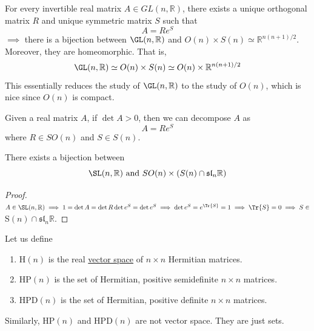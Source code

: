   \begin{corollary}
    \label{thm:uniqueness-of-the-real-polar-decomposition}
    For every invertible real matrix $A \in GL(n, \mathbb{R})$, there exists a unique orthogonal matrix $R$ and unique symmetric matrix $S$ such that
    \begin{equation}
      A = R e^S
    \end{equation}
    $\implies$ there is a bijection between $\GL(n, \mathbb{R})$ and $O(n) \times S(n) \simeq \mathbb{R}^{n(n+1)/2}$. Moreover, they are homeomorphic. That is, 
    \begin{equation}
      \GL(n, \mathbb{R}) \simeq O(n) \times S(n) \simeq O(n) \times \mathbb{R}^{n(n+1)/2}
    \end{equation}
    This essentially reduces the study of $\GL(n, \mathbb{R})$ to the study of $O(n)$, which is nice since $O(n)$ is compact. 
  \end{corollary}

  \begin{corollary}
    \label{thm:polar-decomposition-with-positive-determinant}
    Given a real matrix $A$, if $\det{A} > 0$, then we can decompose $A$ as
    \begin{equation}
      A = R e^S
    \end{equation}
    where $R \in SO(n)$ and $S \in S(n)$. 
  \end{corollary}

  \begin{corollary}
    \label{thm:polar-decomposition-of-slnr}
    There exists a bijection between
    \begin{equation}
      \SL(n, \mathbb{R}) \text{ and } SO(n) \times (S(n) \cap \mathfrak{sl}_n \mathbb{R})
    \end{equation}
  \end{corollary}
  \begin{proof}
    $A \in \SL(n, \mathbb{R}) \implies 1 = \det{A} = \det{R} \det{e^S} = \det{e^S} \implies \det{e^S} = e^{\Tr{S}} = 1 \implies \Tr{S} = 0 \implies S \in$ S$(n) \cap \mathfrak{sl}_n \mathbb{R}$. 
  \end{proof}

  \begin{definition}
    \label{def:hermitian-and-positive-definite-matrix-spaces}
    Let us define
    \begin{enumerate}
      \item H$(n)$ is the real \hyperref[def:vector-space]{vector space} of $n \times n$ Hermitian matrices. 
      \item HP$(n)$ is the set of Hermitian, positive semidefinite $n \times n$ matrices. 
      \item HPD$(n)$ is the set of Hermitian, positive definite $n \times n$ matrices. 
    \end{enumerate}
    Similarly, HP$(n)$ and HPD$(n)$ are not vector space. They are just sets. 
  \end{definition}

